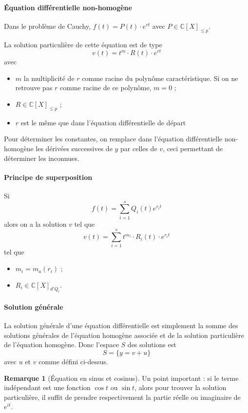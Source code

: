 \documentclass[11pt,a4paper]{article}
\theoremstyle{definition}
\newtheorem{myrem}[mydef]{Remarque}
\newcommand{\C}{\mathbb{C}}
\begin{document}
\paragraph{Équation différentielle non-homogène}
Dans le problème de Cauchy, $f(t) = P(t) \cdot e^{rt}$ avec $P \in \C[X]_{\leq p}$.

La solution particulière de cette équation est de type
\[ v(t) = t^m \cdot R(t) \cdot e^{rt} \]
avec
\begin{itemize}
\item $m$ la multiplicité de $r$ comme racine du polynôme caractéristique. Si on ne retrouve pas $r$ comme racine de ce polynôme, $m = 0$ ;
\item $R \in \C[X]_{\leq p}$ ;
\item $r$ est le même que dans l'équation différentielle de départ
\end{itemize}
Pour déterminer les constantes, on remplace dans l'équation différentielle non-homogène les dérivées successives de $y$ par celles de $v$, ceci permettant de déterminer les inconnues.

\paragraph{Principe de superposition}
Si
\[ f(t) = \sum_{i=1}^s Q_i(t) e^{r_it} \]
alors on a la solution $v$ tel que
\[ v(t) = \sum_{i=1}^s t^{m_i} \cdot R_i(t) \cdot e^{r_it} \]
tel que
\begin{itemize}
\item $m_i = m_a(r_i)$ ;
\item $R_i \in \C[X]_ { d^{\circ} Q_i }$.
\end{itemize}

\paragraph{Solution générale}
La solution générale d'une équation différentielle est simplement la somme des solutions générales de l'équation homogène associée et de la solution particulière de l'équation homogène. Donc l'espace $S$ des solutions est
\[ S = \{y = v + u \} \]
avec $u$ et $v$ comme défini ci-dessus.

\begin{myrem}[Équation en sinus et cosinus]
Un point important : si le terme indépendant est une fonction $\cos t$ ou $\sin t$, alors pour trouver la solution particulière, il suffit de prendre respectivement la partie réelle ou imaginaire de $e^{it}$.
\end{myrem}
\end{document}
